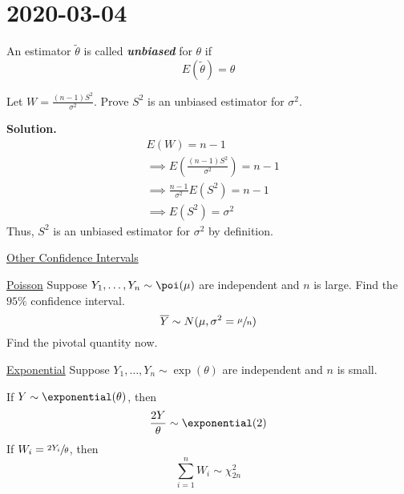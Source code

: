 \section{2020-03-04}

\begin{Definition}{}{}
    An estimator $ \tilde{\theta} $ is called \textbf{\emph{unbiased}} for $ \theta $ if
    \[ E(\tilde{\theta})=\theta \]
\end{Definition}


\begin{Example}{}{}
    Let $ W=\frac{(n-1)S^2}{\sigma^2} $. Prove $ S^2 $ is an unbiased
    estimator for $ \sigma^2 $.

    \textbf{Solution.}
    \begin{align*}
         & E(W)=n-1                                              \\
         & \implies E\left(\frac{(n-1)S^2}{\sigma^2} \right)=n-1 \\
         & \implies \frac{n-1}{\sigma^2} E(S^2)=n-1              \\
         & \implies E(S^2)=\sigma^2
    \end{align*}
    Thus, $ S^2 $ is an unbiased estimator for $ \sigma^2 $ by definition.
\end{Example}


\underline{Other Confidence Intervals}

\underline{Poisson}
Suppose $ Y_1,\ldots ,Y_n \sim \poi(\mu) $
are independent and $ n $ is large. Find the $ 95\% $ confidence interval.
\[ \overline{Y} \sim N(\mu,\sigma^2=\sfrac{\mu}{n}) \]
Find the pivotal quantity now.

\underline{Exponential}
Suppose $ Y_1,\ldots ,Y_n \sim \exp(\theta) $ are independent and $ n $ is small.


\begin{Theorem}{}{}
    If $ Y \sim \exponential(\theta) $, then
    \[ \frac{2Y}{\theta} \sim \exponential(2) \]
    If $ W_i=\sfrac{2Y_i}{\theta} $, then
    \[ \sum\limits_{i=1}^{n} W_i \sim \chi^2_{2n} \]
\end{Theorem}

